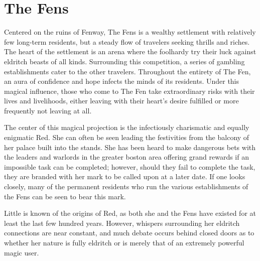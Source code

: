 \documentclass[././main.tex]{subfiles}
\begin{document}
\section{The Fens}
Centered on the ruins of Fenway, The Fens is a wealthy settlement with relatively few long-term residents, but a steady flow of travelers seeking thrills and riches. The heart of the settlement is an arena where the foolhardy try their luck against eldritch beasts of all kinds. Surrounding this competition, a series of gambling establishments cater to the other travelers. Throughout the entirety of The Fen, an aura of confidence and hope infects the minds of its residents. Under this magical influence, those who come to The Fen take extraordinary risks with their lives and livelihoods, either leaving with their heart's desire fulfilled or more frequently not leaving at all. 

The center of this magical projection is the infectiously charismatic and equally enigmatic Red. She can often be seen leading the festivities from the balcony of her palace built into the stands. She has been heard to make dangerous bets with the leaders and warlords in the greater boston area offering grand rewards if an impossible task can be completed; however, should they fail to complete the task, they are branded with her mark to be called upon at a later date. If one looks closely, many of the permanent residents who run the various establishments of the Fens can be seen to bear this mark.

Little is known of the origins of Red, as both she and the Fens have existed for at least the last few hundred years. However, whispers surrounding her eldritch connections are near constant, and much debate occurs behind closed doors as to whether her nature is fully eldritch or is merely that of an extremely powerful magic user.
\end{document}
